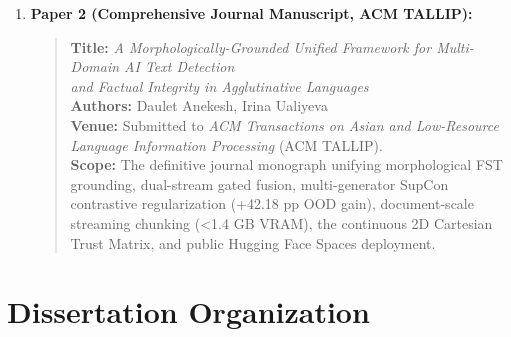 \begin{enumerate}
    \item \textbf{Paper 2 (Comprehensive Journal Manuscript, ACM TALLIP):}
    \begin{quote}
    \textbf{Title:} \textit{A Morphologically-Grounded Unified Framework for Multi-Domain AI Text Detection}\\
    \textit{and Factual Integrity in Agglutinative Languages}~\citep{anekesh2026unified}\\
    \textbf{Authors:} Daulet Anekesh, Irina Ualiyeva\\
    \textbf{Venue:} Submitted to \textit{ACM Transactions on Asian and Low-Resource Language Information Processing} (ACM TALLIP).\\
    \textbf{Scope:} The definitive journal monograph unifying morphological FST grounding, dual-stream gated fusion, multi-generator SupCon contrastive regularization (+42.18 pp OOD gain), document-scale streaming chunking (<1.4 GB VRAM), the continuous 2D Cartesian Trust Matrix, and public Hugging Face Spaces deployment.
    \end{quote}
\end{enumerate}

\section{Dissertation Organization}
\label{sec:intro_organization}


